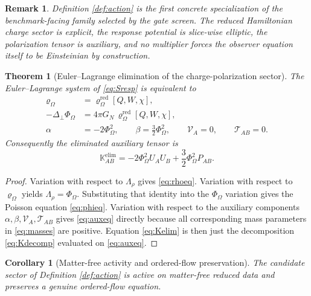\documentclass[11pt]{article}
\newcommand{\ProjSub}{P}
\newcommand{\LapPerp}{\Delta_\perp}
\newcommand{\AuxPol}{\mathbb K}
\newcommand{\FlowPot}{\Phi_\Omega}
\newcommand{\SourceDensity}{\varrho_\Omega}
\newcommand{\SourceDensityRed}{\varrho_\Omega^{\mathrm{red}}}
\newcommand{\SourceMult}{\Lambda_\rho}
\newtheorem{remark}{Remark}
\newtheorem{corollary}{Corollary}
\newtheorem{theorem}{Theorem}
\begin{document}
\begin{remark}
Definition \ref{def:action} is the first concrete specialization of the benchmark-facing family selected by the gate screen. The reduced Hamiltonian charge sector is explicit, the response potential is slice-wise elliptic, the polarization tensor is auxiliary, and no multiplier forces the observer equation itself to be Einsteinian by construction.
\end{remark}

\begin{theorem}[Euler--Lagrange elimination of the charge-polarization sector]
\label{thm:elim}
The Euler--Lagrange system of \eqref{eq:Sresp} is equivalent to
\begin{align}
\SourceDensity &= \SourceDensityRed[Q,W,\chi],
\label{eq:rhoeq}
\\
-\LapPerp\FlowPot &= 4\pi G_N\,\SourceDensityRed[Q,W,\chi],
\label{eq:phieq}
\\
\alpha &= -2\FlowPot^2,
\qquad
\beta = \frac32\FlowPot^2,
\qquad
\mathcal V_A=0,
\qquad
\mathcal T_{AB}=0.
\label{eq:auxeq}
\end{align}
Consequently the eliminated auxiliary tensor is
\begin{equation}
\AuxPol_{AB}^{\mathrm{elim}}
=
-2\FlowPot^2U_AU_B
+\frac32\FlowPot^2\ProjSub_{AB}.
\label{eq:Kelim}
\end{equation}
\end{theorem}

\begin{proof}
Variation with respect to \(\SourceMult\) gives \eqref{eq:rhoeq}. Variation with respect to \(\SourceDensity\) yields \(\SourceMult=\FlowPot\). Substituting that identity into the \(\FlowPot\) variation gives the Poisson equation \eqref{eq:phieq}. Variation with respect to the auxiliary components \(\alpha,\beta,\mathcal V_A,\mathcal T_{AB}\) gives \eqref{eq:auxeq} directly because all corresponding mass parameters in \eqref{eq:masses} are positive. Equation \eqref{eq:Kelim} is then just the decomposition \eqref{eq:Kdecomp} evaluated on \eqref{eq:auxeq}.
\end{proof}

\begin{corollary}[Matter-free activity and ordered-flow preservation]
\label{cor:activity}
The candidate sector of Definition \ref{def:action} is active on matter-free reduced data and preserves a genuine ordered-flow equation.
\end{corollary}
\end{document}
